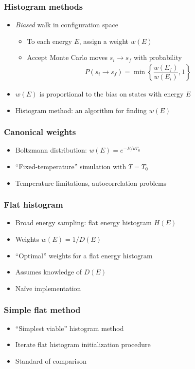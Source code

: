 \documentclass{beamer}
\newcommand{\p}[1]{\left(#1\right)} %
\renewcommand{\set}[1]{\left\{#1\right\}} %
\newcommand{\f}[2]{\dfrac{#1}{#2}}
\let\olditem\item
\renewcommand{\item}{\setlength{\itemsep}{6pt}\olditem}
\begin{document}
\begin{frame}
  \frametitle{Histogram methods}
  \begin{itemize}
  \item {\it Biased} walk in configuration space
    \begin{itemize}
    \item To each energy $E$, assign a weight $w\p{E}$
    \item Accept Monte Carlo moves $s_i\to s_f$ with probability
      \begin{align*}
        P\p{s_i\to s_f}=\min\set{\f{w\p{E_f}}{w\p{E_i}},1}
      \end{align*}
    \end{itemize}
  \item $w\p{E}$ is proportional to the bias on states with energy $E$
  \item Histogram method: an algorithm for finding $w\p{E}$
  \end{itemize}
\end{frame}

\begin{frame}
  \frametitle{Canonical weights}
  \begin{itemize}
  \item Boltzmann distribution: $w\p{E}=e^{-E/kT_0}$
  \item ``Fixed-temperature'' simulation with $T=T_0$
  \item Temperature limitations, autocorrelation problems
  \end{itemize}
\end{frame}

\begin{frame}
  \frametitle{Flat histogram}
  \begin{itemize}
  \item Broad energy sampling: flat energy histogram $H\p{E}$
  \item Weights $w\p{E}=1/D\p{E}$
  \item ``Optimal'' weights for a flat energy histogram
  \item Assumes knowledge of $D\p{E}$
  \item Na\"ive implementation
  \end{itemize}
\end{frame}

\begin{frame}
  \frametitle{Simple flat method}
  \begin{itemize}
  \item ``Simplest viable'' histogram method
  \item Iterate flat histogram initialization procedure
  \item Standard of comparison
  \end{itemize}
\end{frame}
\end{document}
